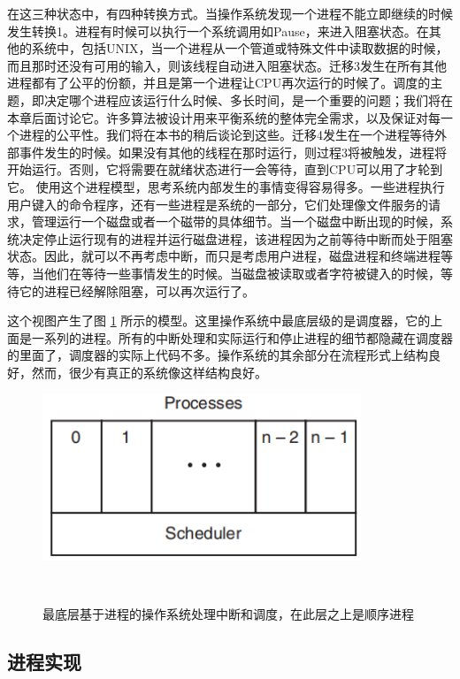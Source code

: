 	在这三种状态中，有四种转换方式。当操作系统发现一个进程不能立即继续的时候发生转换1。进程有时候可以执行一个系统调用如Pause，来进入阻塞状态。在其他的系统中，包括UNIX，当一个进程从一个管道或特殊文件中读取数据的时候，而且那时还没有可用的输入，则该线程自动进入阻塞状态。迁移3发生在所有其他进程都有了公平的份额，并且是第一个进程让CPU再次运行的时候了。调度的主题，即决定哪个进程应该运行什么时候、多长时间，是一个重要的问题；我们将在本章后面讨论它。许多算法被设计用来平衡系统的整体完全需求，以及保证对每一个进程的公平性。我们将在本书的稍后谈论到这些。迁移4发生在一个进程等待外部事件发生的时候。如果没有其他的线程在那时运行，则过程3将被触发，进程将开始运行。否则，它将需要在就绪状态进行一会等待，直到CPU可以用了才轮到它。
	使用这个进程模型，思考系统内部发生的事情变得容易得多。一些进程执行用户键入的命令程序，还有一些进程是系统的一部分，它们处理像文件服务的请求，管理运行一个磁盘或者一个磁带的具体细节。当一个磁盘中断出现的时候，系统决定停止运行现有的进程并运行磁盘进程，该进程因为之前等待中断而处于阻塞状态。因此，就可以不再考虑中断，而只是考虑用户进程，磁盘进程和终端进程等等，当他们在等待一些事情发生的时候。当磁盘被读取或者字符被键入的时候，等待它的进程已经解除阻塞，可以再次运行了。
	
	这个视图产生了图 \ref{fig:scheduler} 所示的模型。这里操作系统中最底层级的是调度器，它的上面是一系列的进程。所有的中断处理和实际运行和停止进程的细节都隐藏在调度器的里面了，调度器的实际上代码不多。操作系统的其余部分在流程形式上结构良好，然而，很少有真正的系统像这样结构良好。 

	\begin{figure}[ht]\small
		\centering
		\includegraphics[width=0.85\textwidth]{FIG/2-3.png}
		\caption{最底层基于进程的操作系统处理中断和调度，在此层之上是顺序进程}　\label{fig:scheduler}
	\end{figure}

	\subsection{进程实现}
	

